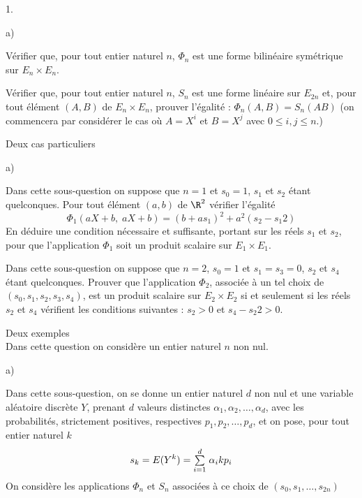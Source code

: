 \documentclass[11pt]{article}%
\begin{document}
\begin{noliste}{1.}
 \setlength{\itemsep}{4mm}
\item 

\begin{noliste}{a)}
 \setlength{\itemsep}{2mm}
\item Vérifier que, pour tout entier naturel $n$, $\Phi_{n}$ est une
forme
bilinéaire symétrique sur $E_{n}\times E_{n}$.

\item Vérifier que, pour tout entier naturel $n$, $S_{n}$ est une forme
linéaire sur $E_{2n}$ et, pour tout élément $(A,B)$ de $E_{n}\times
E_{n}$, prouver l'égalité : $\Phi_{n}(A,B) = S_{n}(AB)$ (on
commencera par considérer le cas où $A = X^{i}$ et $B = X^{j}$ avec
$0\leq i,j\leq n$.)
\end{noliste}

\item Deux cas particuliers

\begin{noliste}{a)}
 \setlength{\itemsep}{2mm}
\item Dans cette sous-question on suppose que $n = 1$ et $s_{0} = 1$,
$s_{1}$ et
$s_{2}$ étant quelconques. Pour tout élément $(a,b)$ de $\R^{2}$
vérifier l'égalité
\[
\Phi_{1}(aX + b,\;aX + b) = (b + as_{1})^{2} + a^{2}(s_{2}-s_{1}{2})
\]
En déduire une condition nécessaire et suffisante, portant sur les
réels $s_{1}$ et $s_{2}$, pour que l'application $\Phi_{1}$ soit un
produit
scalaire sur $E_{1}\times E_{1}$.

\item Dans cette sous-question on suppose que $n = 2$, $s_{0} = 1$ et
$s_{1} = s_{3} = 0$, $s_{2}$ et $s_{4}$ étant quelconques. Prouver que
l'application $\Phi_{2}$, associée à un tel choix de
$(s_{0},s_{1},s_{2},s_{3},s_{4})$, est un produit scalaire sur
$E_{2}\times
E_{2}$ si et seulement si les réels $s_{2}$ et $s_{4}$ vérifient les
conditions suivantes : $s_{2}>0$ et $s_{4}-s_{2}{2}>0$.
\end{noliste}

\item Deux exemples\\
Dans cette question on considère un entier naturel $n$ non nul.

\begin{noliste}{a)}
 \setlength{\itemsep}{2mm}
\item Dans cette sous-question, on se donne un entier naturel $d$ non
nul et
une variable aléatoire discrète $Y$, prenant $d$ valeurs distinctes
$\alpha
_{1},\alpha_{2},\dots,\alpha_{d}$, avec les probabilités, strictement
positives, respectives $p_{1},p_{2},\dots,p_{d}$, et on pose, pour tout
entier naturel $k$
\[
s_{k} = E(Y^{k}) = {\textstyle\sum\limits_{i = 1}^{d}}\hspace{.1cm}\alpha_{i}{k}p_{i}
\]
On considère les applications $\Phi_{n}$ et $S_{n}$ associées à ce
choix de
$(s_{0},s_{1},\dots,s_{2n})$


\end{noliste}
\end{noliste}
\end{document}
